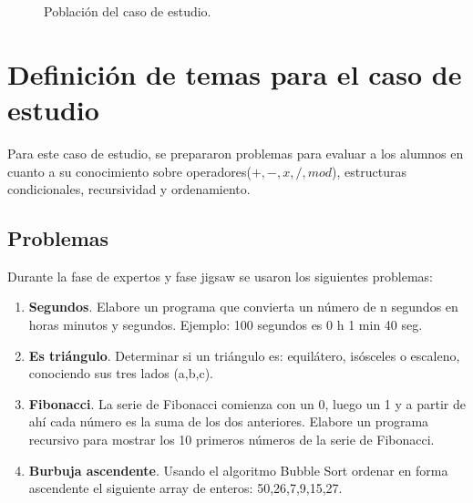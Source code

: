 \begin{figure}
	\centering
	\caption{Población del caso de estudio.}
	\label{fig:c5_poblacion}
\end{figure}
\newpage
\section{Definición de temas para el caso de estudio}
Para este caso de estudio, se prepararon problemas para evaluar a los alumnos en cuanto a su conocimiento sobre operadores($+,-,x,/, mod$), estructuras condicionales, recursividad y ordenamiento.

\subsection{Problemas}
Durante la fase de expertos y fase jigsaw se usaron los siguientes problemas:

\begin{enumerate}
	\item \textbf{Segundos}. Elabore un programa que convierta un número de n segundos en horas minutos y segundos. Ejemplo: 100 segundos es 0 h 1 min 40 seg.
	\item \textbf{Es triángulo}. Determinar si un triángulo es: equilátero, isósceles o escaleno, conociendo sus tres lados (a,b,c).
	\item \textbf{Fibonacci}. La serie de Fibonacci comienza con un 0, luego un 1 y a partir de ahí cada número es la suma de los dos anteriores. Elabore un programa recursivo para mostrar los 10 primeros números de la serie de Fibonacci.
	\item \textbf{Burbuja ascendente}. Usando el algoritmo Bubble Sort ordenar en forma ascendente el siguiente array de enteros: 50,26,7,9,15,27.
	
\end{enumerate}

